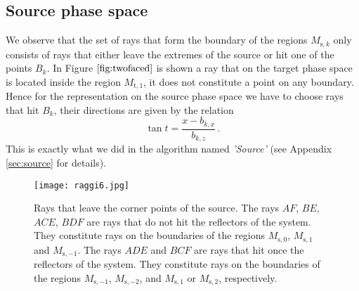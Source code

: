 \subsection{Source phase space}
We observe that the set of rays that form the boundary of the regions $M_{\textrm{s},k}$ only consists of rays that either leave the extremes of the source or hit one of the points
$B_k$. In Figure $\ref{fig:twofaced}$ is shown a ray that on the target phase space is located inside the region
$M_{\textrm{t},1}$, it does not constitute a point on any boundary. 
Hence for the representation on the source phase space we have to choose rays that hit $ B_{k} $, their directions are given by the relation \begin{equation}\label{anglesource}
\tan t = \frac{x-b_{k,x}}{b_{k,z}}\,.
\end{equation}
This is exactly what we did in the algorithm named \textit{'Source'} (see Appendix \ref{sec:source} for details).
\begin{figure}
\texttt{[image: raggi6.jpg]}
\caption{\footnotesize{Rays that leave the corner points of the source. The rays $AF$, $BE$, $ACE$, $BDF$ are rays that do not hit the reflectors of the system.
They constitute rays on the boundaries of the regions $M_{\textrm{s},0}$, $M_{\textrm{s},1}$ and $M_{\textrm{s},-1}$.
 The rays $ADE$ and $BCF$ are rays that hit once the reflectors of the system. They constitute rays on the boundaries of the regions
 $M_{\textrm{s},-1}$, $M_{\textrm{s},-2}$, and $M_{\textrm{s},1}$ or $M_{\textrm{s},2}$, respectively.}}
\label{fig:raggi}
\end{figure}

